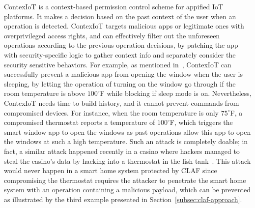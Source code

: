 \documentclass[letterpaper,12pt]{article}
\begin{document}
ContexIoT is a context-based permission control scheme for appified IoT platforms. It makes a decision based on the past context of the user when an operation is detected. ContexIoT targets malicious apps or legitimate ones with overprivileged access rights, and can effectively filter out the unforeseen operations according to the previous operation decisions, by patching the app with security-specific logic to gather context info and separately consider the security sensitive behaviors. For example, as mentioned in~\cite{jia2017contexiot}, ContexIoT can successfully prevent a malicious app from opening the window when the user is sleeping, by letting the operation of turning on the window go through if the room temperature is above  $100^\circ$F while blocking if sleep mode is on. Nevertheless, ContexIoT needs time to build history, and it cannot prevent commands from compromised devices. For instance, when the room temperature is only $75^\circ$F, a compromised thermostat reports a temperature of $100^\circ$F, which triggers the smart window app to open the windows as past operations allow this app to open the windows at such a high temperature. Such an attack is completely doable; in fact, a similar attack happened recently in a casino where hackers managed to steal the casino's data by hacking into a thermostat in the fish tank~\cite{casinothero}. This attack would never happen in a smart home system protected by CLAF since compromising the thermostat requires the attacker to penetrate the smart home system with an operation containing a malicious payload, which can be prevented as illustrated by the third example presented in Section~\ref{subsec:claf-approach}. %
\end{document}
